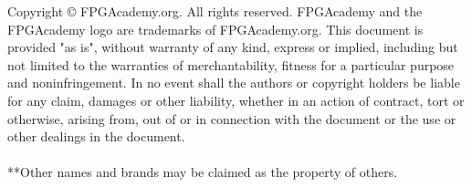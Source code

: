 %


\clearpage
\vspace{1in}

\noindent

Copyright {\copyright} FPGAcademy.org. All rights reserved. FPGAcademy and the 
FPGAcademy logo are trademarks of FPGAcademy.org.  This document is provided 
"as is", without warranty of any kind, express or implied, including but not 
limited to the warranties of merchantability, fitness for a particular purpose 
and noninfringement. In no event shall the authors or copyright holders be 
liable for any claim, damages or other liability, whether in an action of 
contract, tort or otherwise, arising from, out of or in connection with the 
document or the use or other dealings in the document.
~\\
~\\
**Other names and brands may be claimed as the property of others.


